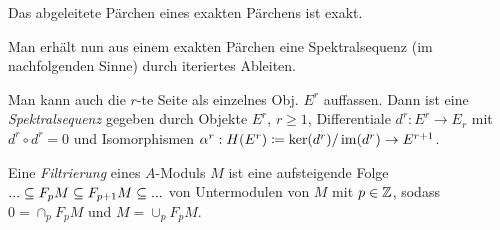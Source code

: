 \documentclass{cheat-sheet}
\begin{document}
\begin{lem}
  Das abgeleitete Pärchen eines exakten Pärchens ist exakt.
\end{lem}

\begin{bem}
  Man erhält nun aus einem exakten Pärchen eine Spektralsequenz (im nachfolgenden Sinne) durch iteriertes Ableiten.
\end{bem}

\begin{bem}
  Man kann auch die $r$-te Seite als einzelnes Obj. $E^r$ auffassen. Dann ist eine \emph{Spektralsequenz} gegeben durch Objekte $E^r$, $r \geq 1$, Differentiale $d^r : E^r \to E_r$ mit $d^r \circ d^r = 0$ und Isomorphismen $\alpha^r : H(E^r) \coloneqq \ker(d^r) / \operatorname{im}(d^r) \to E^{r+1}$.
\end{bem}

\begin{defn}
  Eine \emph{Filtrierung} eines $A$-Moduls $M$ ist eine aufsteigende Folge $... \subseteq F_p M \subseteq F_{p+1} M \subseteq ...$ von Untermodulen von $M$ mit $p \in \mathbb{Z}$, sodass $0 = \cap_p F_p M$ und $M = \cup_p F_p M$.
\end{defn}


\end{document}
